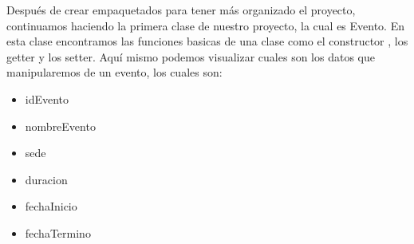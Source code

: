 \documentclass[10pt,a4paper]{article}
\begin{document}
	\subection{\color{colorIPN}{Evento}}
	Después de crear empaquetados para tener más organizado el proyecto, continuamos haciendo la primera clase de nuestro proyecto, la cual es Evento. En esta clase encontramos las funciones basicas de una clase como el constructor , los getter y los setter. Aquí mismo podemos visualizar cuales son los datos que manipularemos de un evento, los cuales son:
	\begin{itemize}
	    \item idEvento
        \item nombreEvento
        \item sede
        \item duracion
        \item fechaInicio
        \item fechaTermino
	\end{itemize}
\end{document}
